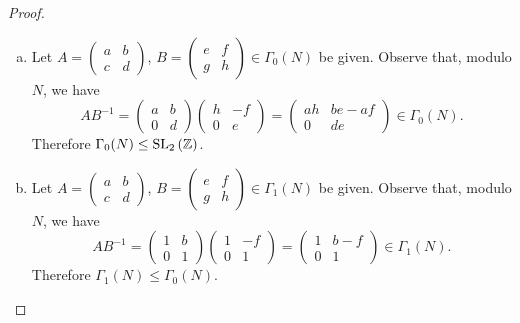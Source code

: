 \documentclass[10pt]{amsart}
\begin{document}
\begin{thm}
  \begin{proof}
    \begin{enumerate}[(a)]
    \item
      Let $A = \left(
      \begin{array}{cc}
	a & b\\
	c & d
      \end{array}
      \right)$,
      $B = \left(
      \begin{array}{cc}
	e & f\\
	g & h
      \end{array}
      \right) \in \Gamma_0(N)$ be given.
      Observe that, modulo $N$, we have
      $$AB^{-1} = 
      \left(
      \begin{array}{cc}
	a & b\\
	0 & d
      \end{array}
      \right)
      \left(
      \begin{array}{cc}
	h & -f\\
	0 & e
      \end{array}
      \right)
      =
      \left(
      \begin{array}{cc}
	ah & be - af\\
	0 & de
      \end{array}
      \right) \in \Gamma_0(N).$$
      Therefore $\Gamma_0(N) \leq \operatorname{SL}_2\left(\mathbb{Z}\right)$.
    \item
      Let $A = \left(
      \begin{array}{cc}
	a & b\\
	c & d
      \end{array}
      \right)$,
      $B = \left(
      \begin{array}{cc}
	e & f\\
	g & h
      \end{array}
      \right) \in \Gamma_1(N)$ be given.
      Observe that, modulo $N$, we have
      $$AB^{-1} = 
      \left(
      \begin{array}{cc}
	1 & b\\
	0 & 1
      \end{array}
      \right)
      \left(
      \begin{array}{cc}
	1 & -f\\
	0 & 1
      \end{array}
      \right)
      =
      \left(
      \begin{array}{cc}
	1 & b - f\\
	0 & 1
      \end{array}
      \right) \in \Gamma_1(N).$$
      Therefore $\Gamma_1(N) \leq \Gamma_0(N)$.
      

\end{enumerate}
\end{proof}
\end{thm}
\end{document}
